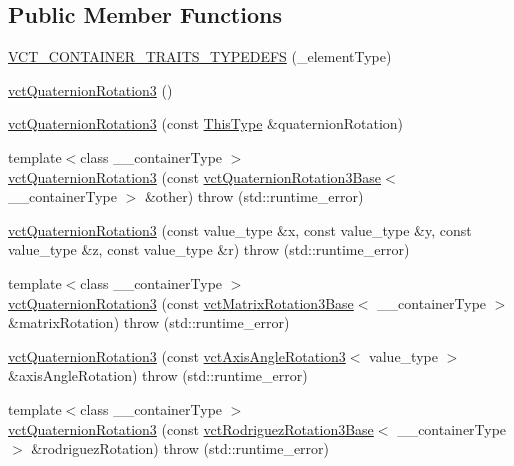 \subsection*{Public Member Functions}
\begin{DoxyCompactItemize}
\item 
\hyperlink{classvct_quaternion_rotation3_a21ab53315a516e984a6700808c46c02a}{V\-C\-T\-\_\-\-C\-O\-N\-T\-A\-I\-N\-E\-R\-\_\-\-T\-R\-A\-I\-T\-S\-\_\-\-T\-Y\-P\-E\-D\-E\-F\-S} (\-\_\-element\-Type)
\item 
\hyperlink{classvct_quaternion_rotation3_aed78b9378e74d3ba8b71349472c57a67}{vct\-Quaternion\-Rotation3} ()
\item 
\hyperlink{classvct_quaternion_rotation3_a02447e98501a97832e7196dee7b9c2dc}{vct\-Quaternion\-Rotation3} (const \hyperlink{classvct_fixed_size_const_vector_base_a071063bc4fa43112cc287b2dbef53180}{This\-Type} \&quaternion\-Rotation)
\item 
{\footnotesize template$<$class \-\_\-\-\_\-container\-Type $>$ }\\\hyperlink{classvct_quaternion_rotation3_a92d85d26e54699772e450caf5f362534}{vct\-Quaternion\-Rotation3} (const \hyperlink{classvct_quaternion_rotation3_base}{vct\-Quaternion\-Rotation3\-Base}$<$ \-\_\-\-\_\-container\-Type $>$ \&other)  throw (std\-::runtime\-\_\-error)
\item 
\hyperlink{classvct_quaternion_rotation3_abc8fde980116d00d463f09bdf9218133}{vct\-Quaternion\-Rotation3} (const value\-\_\-type \&x, const value\-\_\-type \&y, const value\-\_\-type \&z, const value\-\_\-type \&r)  throw (std\-::runtime\-\_\-error)
\item 
{\footnotesize template$<$class \-\_\-\-\_\-container\-Type $>$ }\\\hyperlink{classvct_quaternion_rotation3_a61569b6daf69e5b0a42edb6681c73c35}{vct\-Quaternion\-Rotation3} (const \hyperlink{classvct_matrix_rotation3_base}{vct\-Matrix\-Rotation3\-Base}$<$ \-\_\-\-\_\-container\-Type $>$ \&matrix\-Rotation)  throw (std\-::runtime\-\_\-error)
\item 
\hyperlink{classvct_quaternion_rotation3_a719e8e89a3eac0d6a487ed81affc6271}{vct\-Quaternion\-Rotation3} (const \hyperlink{classvct_axis_angle_rotation3}{vct\-Axis\-Angle\-Rotation3}$<$ value\-\_\-type $>$ \&axis\-Angle\-Rotation)  throw (std\-::runtime\-\_\-error)
\item 
{\footnotesize template$<$class \-\_\-\-\_\-container\-Type $>$ }\\\hyperlink{classvct_quaternion_rotation3_aaa36f8d822d685d004215863f090fe37}{vct\-Quaternion\-Rotation3} (const \hyperlink{classvct_rodriguez_rotation3_base}{vct\-Rodriguez\-Rotation3\-Base}$<$ \-\_\-\-\_\-container\-Type $>$ \&rodriguez\-Rotation)  throw (std\-::runtime\-\_\-error)

\end{DoxyCompactItemize}
